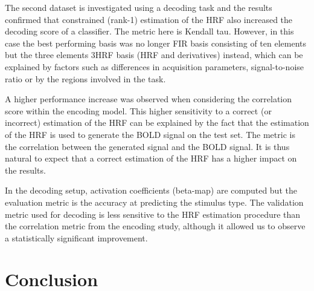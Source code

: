 
The second dataset is investigated using a decoding task and the results confirmed that
constrained (rank-1) estimation of the HRF also increased the decoding score
of a classifier. The metric here is Kendall tau. However, in this case the
best performing basis was no longer FIR basis consisting of ten elements but
the three elements 3HRF basis (HRF and derivatives) instead, which can be
explained by factors such as differences in acquisition parameters,
\mbox{signal-to-noise} ratio or by the regions involved in the task.

A higher performance increase was observed when considering the correlation score within the encoding model. This 
higher sensitivity to a correct (or incorrect) estimation of the HRF
can be explained by the fact that the
estimation of the HRF is used to generate the BOLD signal on the test set. The metric
is the correlation between the generated signal and the BOLD signal.
It is thus natural to expect that a correct estimation of the HRF has a higher
impact on the results. 

 In the decoding setup, activation coefficients 
(beta-map) are computed but the evaluation metric is the accuracy at predicting the
stimulus type. The validation metric used for decoding is less sensitive to the HRF estimation procedure than the correlation metric from the encoding study, although it
allowed us to observe a statistically significant improvement.






\section{Conclusion}

